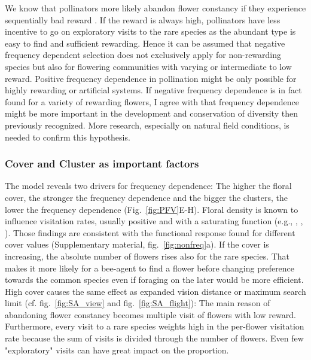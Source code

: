 We know that pollinators more likely abandon flower constancy if they experience sequentially bad reward \citep{chittka1997foraging,goulson1994model}. If the reward is always high, pollinators have less incentive to go on exploratory visits to the rare species as the abundant type is easy to find and sufficient rewarding. Hence it can be assumed that negative frequency dependent selection does not exclusively apply for non-rewarding species but also for flowering communities with varying or intermediate to low reward. Positive frequency dependence in pollination might be only possible for highly rewarding or artificial systems. If negative frequency dependence is in fact found for a variety of rewarding flowers, I agree with \cite{Eckhart2006frequency} that frequency dependence might be more important in the development and conservation of diversity then previously recognized. More research, especially on natural field conditions, is needed to confirm this hypothesis.



\subsubsection*{Cover and Cluster as important factors}

The model reveals two drivers for frequency dependence: The higher the floral cover, the stronger the frequency dependence and the bigger the clusters, the lower the frequency dependence (Fig.~\ref{fig:PFV}E-H). 
Floral density is known to influence visitation rates, usually positive and with a saturating function (e.g.\citealt{rathcke1983competition}, \citealt{essenberg2012explaining}, \citealt{bernhardt2008effects}, \citealt{Kunin1997}). Those findings are consistent with the functional response found for different cover values (Supplementary material, fig.~\ref{fig:nonfreq}a). If the cover is increasing, the absolute number of flowers rises also for the rare species. That makes it more likely for a bee-agent to find a flower before changing preference towards the common species even if foraging on the later would be more efficient. High cover causes the same effect as expanded vision distance or maximum search limit (cf. fig.~\ref{fig:SA_view} and fig.~\ref{fig:SA_flight}): The main reason of abandoning flower constancy becomes multiple visit of flowers with low reward. Furthermore, every visit to a rare species weights high in the per-flower visitation rate because the sum of visits is divided through the number of flowers. Even few "exploratory" visits can have great impact on the proportion. 

